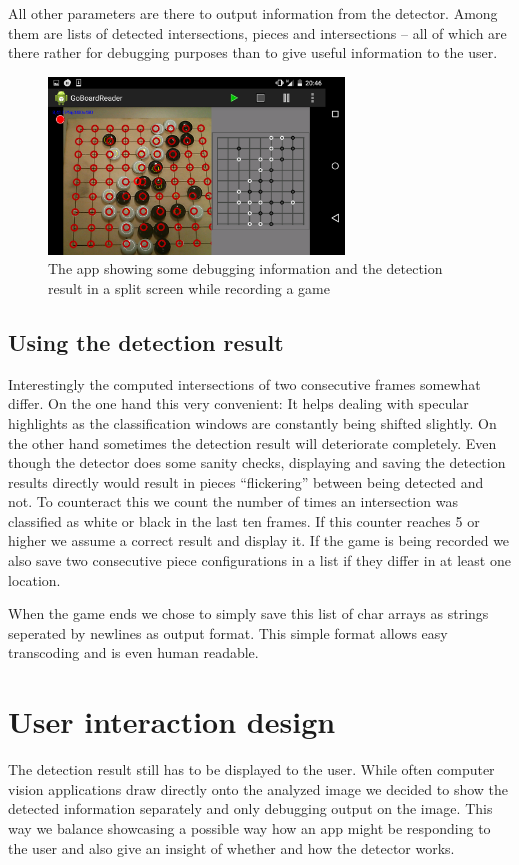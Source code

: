 	All other parameters are there to output information from the detector. Among them are lists of detected intersections, pieces and intersections -- all of which are there rather for debugging purposes than to give useful information to the user.

	\begin{figure}[t!]
		\center
		\includegraphics[width=0.7\textwidth]{images/android_ui.png}
		\caption{The app showing some debugging information and the detection result in a split screen while recording a game}
		\label{fig:android_ui}
	\end{figure}

	\subsection{Using the detection result}
	\label{android-detector-usingResults}
	Interestingly the computed intersections of two consecutive frames somewhat differ. On the one hand this very convenient: It helps dealing with specular highlights as the classification windows are constantly being shifted slightly. On the other hand sometimes the detection result will deteriorate completely. Even though the detector does some sanity checks, displaying and saving the detection results directly would result in pieces ``flickering'' between being detected and not. To counteract this we count the number of times an intersection was classified as white or black in the last ten frames. If this counter reaches 5 or higher we assume a correct result and display it. If the game is being recorded we also save two consecutive piece configurations in a list if they differ in at least one location.

	When the game ends we chose to simply save this list of char arrays as strings seperated by newlines as output format. This simple format allows easy transcoding and is even human readable.

	\section{User interaction design}
	\label{android-ui}
	The detection result still has to be displayed to the user. While often computer vision applications draw directly onto the analyzed image we decided to show the detected information separately and only debugging output on the image. This way we balance showcasing a possible way how an app might be responding to the user and also give an insight of whether and how the detector works.

